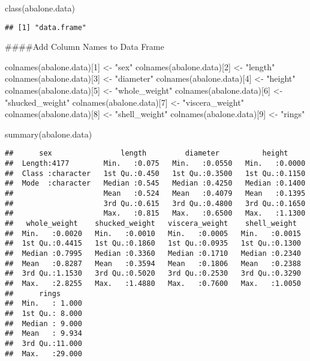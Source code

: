 \documentclass[
]{article}
\newenvironment{Shaded}{\begin{snugshade}}{\end{snugshade}}
\newcommand{\DecValTok}[1]{\textcolor[rgb]{0.00,0.00,0.81}{#1}}
\newcommand{\FunctionTok}[1]{\textcolor[rgb]{0.00,0.00,0.00}{#1}}
\newcommand{\NormalTok}[1]{#1}
\newcommand{\OtherTok}[1]{\textcolor[rgb]{0.56,0.35,0.01}{#1}}
\newcommand{\StringTok}[1]{\textcolor[rgb]{0.31,0.60,0.02}{#1}}
\begin{document}
\begin{Shaded}
\begin{Highlighting}[]
\FunctionTok{class}\NormalTok{(abalone.data)}
\end{Highlighting}
\end{Shaded}

\begin{verbatim}
## [1] "data.frame"
\end{verbatim}

\#\#\#\#Add Column Names to Data Frame

\begin{Shaded}
\begin{Highlighting}[]
\FunctionTok{colnames}\NormalTok{(abalone.data)[}\DecValTok{1}\NormalTok{] }\OtherTok{\textless{}{-}} \StringTok{"sex"}
\FunctionTok{colnames}\NormalTok{(abalone.data)[}\DecValTok{2}\NormalTok{] }\OtherTok{\textless{}{-}} \StringTok{"length"}
\FunctionTok{colnames}\NormalTok{(abalone.data)[}\DecValTok{3}\NormalTok{] }\OtherTok{\textless{}{-}} \StringTok{"diameter"}
\FunctionTok{colnames}\NormalTok{(abalone.data)[}\DecValTok{4}\NormalTok{] }\OtherTok{\textless{}{-}} \StringTok{"height"}
\FunctionTok{colnames}\NormalTok{(abalone.data)[}\DecValTok{5}\NormalTok{] }\OtherTok{\textless{}{-}} \StringTok{"whole\_weight"}
\FunctionTok{colnames}\NormalTok{(abalone.data)[}\DecValTok{6}\NormalTok{] }\OtherTok{\textless{}{-}} \StringTok{"shucked\_weight"}
\FunctionTok{colnames}\NormalTok{(abalone.data)[}\DecValTok{7}\NormalTok{] }\OtherTok{\textless{}{-}} \StringTok{"viscera\_weight"}
\FunctionTok{colnames}\NormalTok{(abalone.data)[}\DecValTok{8}\NormalTok{] }\OtherTok{\textless{}{-}} \StringTok{"shell\_weight"}
\FunctionTok{colnames}\NormalTok{(abalone.data)[}\DecValTok{9}\NormalTok{] }\OtherTok{\textless{}{-}} \StringTok{"rings"}

\FunctionTok{summary}\NormalTok{(abalone.data)}
\end{Highlighting}
\end{Shaded}

\begin{verbatim}
##      sex                length         diameter          height      
##  Length:4177        Min.   :0.075   Min.   :0.0550   Min.   :0.0000  
##  Class :character   1st Qu.:0.450   1st Qu.:0.3500   1st Qu.:0.1150  
##  Mode  :character   Median :0.545   Median :0.4250   Median :0.1400  
##                     Mean   :0.524   Mean   :0.4079   Mean   :0.1395  
##                     3rd Qu.:0.615   3rd Qu.:0.4800   3rd Qu.:0.1650  
##                     Max.   :0.815   Max.   :0.6500   Max.   :1.1300  
##   whole_weight    shucked_weight   viscera_weight    shell_weight   
##  Min.   :0.0020   Min.   :0.0010   Min.   :0.0005   Min.   :0.0015  
##  1st Qu.:0.4415   1st Qu.:0.1860   1st Qu.:0.0935   1st Qu.:0.1300  
##  Median :0.7995   Median :0.3360   Median :0.1710   Median :0.2340  
##  Mean   :0.8287   Mean   :0.3594   Mean   :0.1806   Mean   :0.2388  
##  3rd Qu.:1.1530   3rd Qu.:0.5020   3rd Qu.:0.2530   3rd Qu.:0.3290  
##  Max.   :2.8255   Max.   :1.4880   Max.   :0.7600   Max.   :1.0050  
##      rings       
##  Min.   : 1.000  
##  1st Qu.: 8.000  
##  Median : 9.000  
##  Mean   : 9.934  
##  3rd Qu.:11.000  
##  Max.   :29.000
\end{verbatim}
\end{document}
